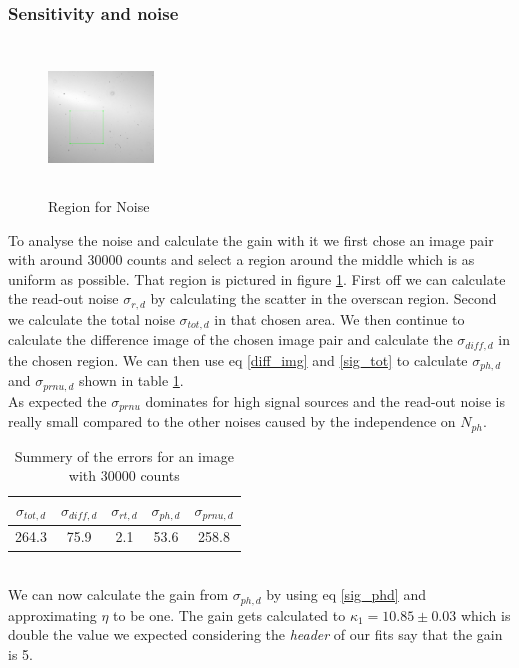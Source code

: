 \subsubsection{Sensitivity and noise}
\begin{figure}
	\centering
	\includegraphics[width=0.25\textwidth, height=4cm]{report_pictures/sensitivity_region.png}
	\caption{Region for Noise}
	\vspace{-10pt}
	\label{area}
\end{figure}
To analyse the noise and calculate the gain with it we first chose an image pair with around 30000 counts and select a region around the middle which is as uniform as possible. That region is pictured in figure \ref{area}. First off we can calculate the read-out noise $\sigma_{r,d}$ by calculating the scatter in the overscan region. Second we calculate the total noise $\sigma_{tot,d}$ in that chosen area. We then continue to calculate the difference image of the chosen image pair and calculate the $\sigma_{diff,d}$ in the chosen region. We can then use eq \eqref{diff_img} and \eqref{sig_tot} to calculate $\sigma_{ph,d}$ and $\sigma_{prnu,d}$ shown in table \ref{errors1}.
\vspace{2mm}\\
As expected the $\sigma_ {prnu}$ dominates for high signal sources and the read-out noise is really small compared to the other noises caused by the independence on $N_{ph}$.
\begin{table}[h]
\centering
\begin{tabular}{c|c||c|c|c}
$\sigma_{tot,d}$ & $\sigma_{diff,d}$ & $\sigma_{rt,d}$ & $\sigma_{ph,d}$ & $\sigma_{prnu,d}$ \\
\hline
264.3 & 75.9 & 2.1 & 53.6 & 258.8 \\
\end{tabular}
\caption{Summery of the errors for an image with 30000 counts}
\label{errors1}
\end{table}
\vspace{12mm}\\
We can now calculate the gain from $\sigma_{ph,d}$ by using eq \ref{sig_phd} and approximating $\eta$ to be one. The gain gets calculated to $\kappa_1 = 10.85 \pm 0.03$ which is double the value we expected considering the \textit{header} of our fits say that the gain is 5. 
